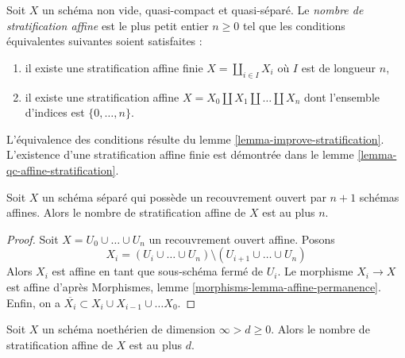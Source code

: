 \begin{definition}
\label{definition-affine-stratification-number}
Soit $X$ un schéma non vide, quasi-compact et quasi-séparé. Le
{\it nombre de stratification affine} est le plus petit entier $n \geq 0$
tel que les conditions équivalentes suivantes soient satisfaites :
\begin{enumerate}
\item il existe une stratification affine finie
$X = \coprod_{i \in I} X_i$ où $I$ est de longueur $n$,
\item il existe une stratification affine
$X = X_0 \amalg X_1 \amalg \ldots \amalg X_n$ dont
l'ensemble d'indices est $\{0, \ldots, n\}$.
\end{enumerate}
\end{definition}

\noindent
L'équivalence des conditions résulte du
lemme \ref{lemma-improve-stratification}.
L'existence d'une stratification affine finie
est démontrée dans le lemme \ref{lemma-qc-affine-stratification}.

\begin{lemma}
\label{lemma-affine-stratification-number-bound}
Soit $X$ un schéma séparé qui possède un recouvrement ouvert par
$n + 1$ schémas affines. Alors le nombre de stratification affine de $X$
est au plus $n$.
\end{lemma}

\begin{proof}
Soit $X = U_0 \cup \ldots \cup U_n$ un recouvrement ouvert affine.
Posons
$$
X_i = (U_i \cup \ldots \cup U_n) \setminus
(U_{i + 1} \cup \ldots \cup U_n)
$$
Alors $X_i$ est affine en tant que sous-schéma fermé de $U_i$. Le morphisme $X_i \to X$
est affine d'après Morphismes, lemme \ref{morphisms-lemma-affine-permanence}.
Enfin, on a $\overline{X_i} \subset X_i \cup X_{i - 1} \cup \ldots X_0$.
\end{proof}

\begin{lemma}
\label{lemma-affine-stratification-number-bound-Noetherian}
Soit $X$ un schéma noethérien de dimension $\infty > d \geq 0$.
Alors le nombre de stratification affine de $X$ est au plus $d$.
\end{lemma}

